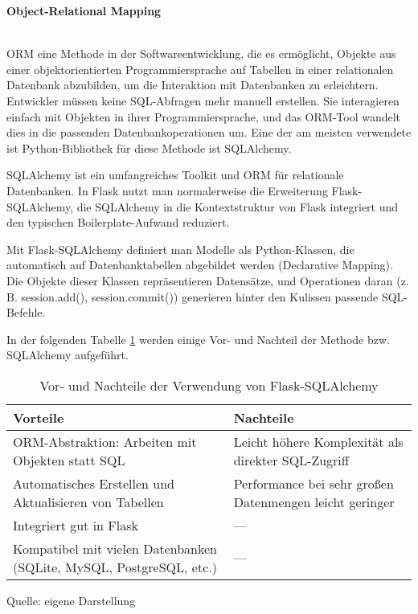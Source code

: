 \textbf{Object-Relational Mapping}

\\

\ac{ORM} eine Methode in der Softwareentwicklung, die es ermöglicht, Objekte aus einer objektorientierten Programmiersprache auf
Tabellen in einer relationalen Datenbank abzubilden, um die Interaktion mit Datenbanken zu erleichtern.
Entwickler müssen keine SQL-Abfragen mehr manuell erstellen.
Sie interagieren einfach mit Objekten in ihrer Programmiersprache,
und das ORM-Tool wandelt dies in die passenden Datenbankoperationen um. \cite*{miguelgrinberg_flask_mega_tutorial_db}
Eine der am meisten verwendete ist Python-Bibliothek für diese Methode ist SQLAlchemy.

SQLAlchemy ist ein umfangreiches Toolkit und \ac{ORM} für relationale Datenbanken.
In Flask nutzt man normalerweise die Erweiterung Flask-SQLAlchemy, die SQLAlchemy in die Kontextstruktur von Flask
integriert und den typischen Boilerplate-Aufwand reduziert.\cite*{flask_sqlalchemy_docs}

Mit Flask-SQLAlchemy definiert man Modelle als Python-Klassen, die automatisch auf Datenbanktabellen abgebildet werden (Declarative Mapping).
Die Objekte dieser Klassen repräsentieren Datensätze, und Operationen daran (z. B. session.add(), session.commit()) generieren hinter den Kulissen passende SQL-Befehle.\cite*{flask_sqlalchemy_docs}

In der folgenden Tabelle \ref{tab:sqlalchemy_vor_nachteile} werden einige Vor- und Nachteil der Methode bzw. SQLAlchemy aufgeführt.

\begin{table}[H]
    \centering
    \begin{tabular}{|p{}|p{}|}
        \hline
        \textbf{Vorteile} & \textbf{Nachteile} \\
        \hline
        ORM-Abstraktion: Arbeiten mit Objekten statt SQL &
        Leicht höhere Komplexität als direkter SQL-Zugriff \\
        \hline
        Automatisches Erstellen und Aktualisieren von Tabellen &
        Performance bei sehr großen Datenmengen leicht geringer \\
        \hline
        Integriert gut in Flask &
        — \\
        \hline
        Kompatibel mit vielen Datenbanken (SQLite, MySQL, PostgreSQL, etc.) &
        — \\
        \hline
    \end{tabular}
    \caption{Vor- und Nachteile der Verwendung von Flask-SQLAlchemy}
    \label{tab:sqlalchemy_vor_nachteile}
    \vspace{0.2cm}
    {\small Quelle: eigene Darstellung}
\end{table}

